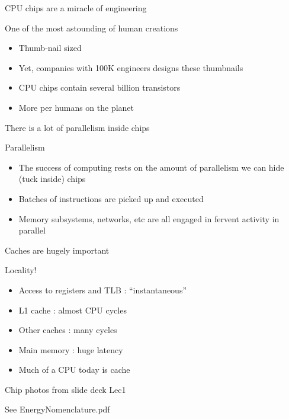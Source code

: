 \documentclass{beamer}
\begin{document}

\begin{frame}{CPU chips are a miracle of engineering}

\noindent One of the most astounding of human creations
\begin{itemize}
\item Thumb-nail sized
\item Yet, companies with 100K engineers designs these
  thumbnails
\item CPU chips contain several billion transistors
\item More per humans on the planet
\end{itemize}
 
\end{frame}



\begin{frame}{There is a lot of parallelism inside chips}

\noindent Parallelism
\begin{itemize}
\item The success of computing rests on the amount of
  parallelism we can hide (tuck inside) chips
\item Batches of instructions are picked up and executed
\item Memory subsystems, networks, etc are all 
  engaged in fervent activity in parallel
\end{itemize}
 
\end{frame}



\begin{frame}{Caches are hugely important}

\noindent Locality!
\begin{itemize}
\item Access to registers and TLB : ``instantaneous''
\item L1 cache : almost CPU cycles
\item Other caches : many cycles
\item Main memory : huge latency
\item Much of a CPU today is cache
\end{itemize}
 
\end{frame}




\begin{frame}{Chip photos from slide deck Lec1}

See EnergyNomenclature.pdf

\end{frame}
\end{document}
